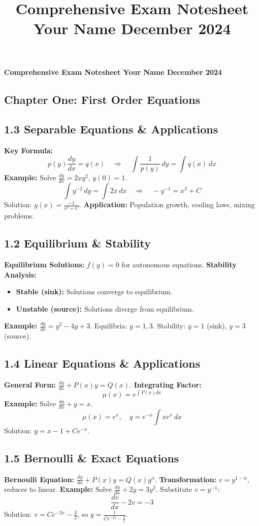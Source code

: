 \documentclass[10pt]{article}
\title{\raggedright \large Comprehensive Exam Notesheet \hfill Your Name \hfill December 2024 \vspace{-3em}}
\date{}
\begin{document}
\textbf{Comprehensive Exam Notesheet \hfill Your Name \hfill December 2024}
\begin{multicols}{2}

\section*{Chapter One: First Order Equations}
\subsection*{1.3 Separable Equations \& Applications}
\textbf{Key Formula:}
\[
p(y) \frac{dy}{dx} = q(x) \quad \Rightarrow \quad \int \frac{1}{p(y)} \, dy = \int q(x) \, dx
\]
\textbf{Example:} Solve \( \frac{dy}{dx} = 2xy^2 \), \( y(0) = 1 \).
\[
\int y^{-2} \, dy = \int 2x \, dx \quad \Rightarrow \quad -y^{-1} = x^2 + C
\]
Solution: \( y(x) = \frac{-1}{x^2 + C} \).  
\textbf{Application:} Population growth, cooling laws, mixing problems.

\subsection*{1.2 Equilibrium \& Stability}
\textbf{Equilibrium Solutions:} \( f(y) = 0 \) for autonomous equations.  
\textbf{Stability Analysis:} 
\begin{itemize}
    \item \textbf{Stable (sink):} Solutions converge to equilibrium.
    \item \textbf{Unstable (source):} Solutions diverge from equilibrium.
\end{itemize}
\textbf{Example:} \( \frac{dy}{dx} = y^2 - 4y + 3 \).  
Equilibria: \( y = 1, 3 \). Stability: \( y = 1 \) (sink), \( y = 3 \) (source).  

\subsection*{1.4 Linear Equations \& Applications}
\textbf{General Form:} \( \frac{dy}{dx} + P(x)y = Q(x) \).  
\textbf{Integrating Factor:}  
\[
\mu(x) = e^{\int P(x)dx}
\]
\textbf{Example:} Solve \( \frac{dy}{dx} + y = x \).  
\[
\mu(x) = e^x, \quad y = e^{-x}\int xe^x \, dx
\]
Solution: \( y = x - 1 + Ce^{-x} \).

\subsection*{1.5 Bernoulli \& Exact Equations}
\textbf{Bernoulli Equation:} \( \frac{dy}{dx} + P(x)y = Q(x)y^n \).  
\textbf{Transformation:} \( v = y^{1-n} \), reduces to linear.  
\textbf{Example:} Solve \( \frac{dy}{dx} + 2y = 3y^2 \).  
Substitute \( v = y^{-1} \):  
\[
\frac{dv}{dx} - 2v = -3
\]
Solution: \( v = Ce^{-2x} - \frac{3}{2} \), so \( y = \frac{1}{Ce^{-2x} - \frac{3}{2}} \).


\end{multicols}
\end{document}
